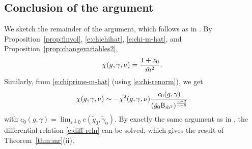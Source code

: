 
\subsection{Conclusion of the argument}
\label{sec:suscept-conc}

We sketch the remainder of the argument, which follows as in
\cite[Section~\ref{log-sec:chvar}]{BBS-saw4-log}.
By Proposition~\ref{prop:finvol}, \eqref{e:chichihat}, \eqref{e:chi-m-hat},
and Proposition~\ref{prop:changevariables2},
\begin{equation}
\label{e:chi-renorm}
\chi(g, \gamma, \nu)
	=
\frac{1 + \tilde z_0}{\tilde m^2}.
\end{equation}
Similarly, from \eqref{e:chiprime-m-hat} (using \eqref{e:chi-renorm}), we get
\begin{equation}
\label{e:diff-reln}
\chi(g, \gamma, \nu)
	\sim
-\chi^2(g, \gamma, \nu)
\frac{c_0(g, \gamma)}{(\tilde g_0 {\sf B}_{\tilde m^2})^{\frac{n+2}{n+8}}}
\end{equation}
with
$c_0(g, \gamma) = \lim_{\varepsilon\downarrow0} c(\tilde g_0, \tilde\gamma_0)$.
By exactly the same argument as in \cite[Section~\ref{log-sec:pfsuscept}]{BBS-saw4-log},
the differential relation \eqref{e:diff-reln}
can be solved, which gives the result of Theorem~\ref{thm:mr}(ii).

